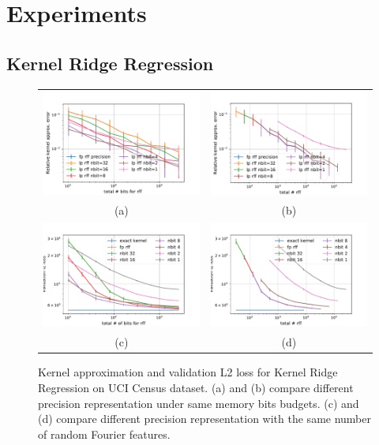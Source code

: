 \section{Experiments}
\label{sec:experiments}
\subsection{Kernel Ridge Regression}
\begin{figure}
\centering
\begin{tabular}{c c}
	\includegraphics[width=.45\linewidth]{figures/kernel_approx_error.pdf} &
	\includegraphics[width=.45\linewidth]{figures/kernel_approx_error_n_fp.pdf} \\
	(a) & (b) \\
	\includegraphics[width=.45\linewidth]{figures/valid_l2.pdf} &
	\includegraphics[width=.45\linewidth]{figures/valid_l2_n_fp.pdf}  \\
		(c) & (d) \\
\end{tabular}
\caption{Kernel approximation and validation L2 loss for Kernel Ridge Regression on UCI Census dataset. (a) and (b) compare different precision representation under same memory bits budgets. (c) and (d) compare different precision representation with the same number of random Fourier features.}
\label{fig:kernel_and_l2}
\end{figure}

